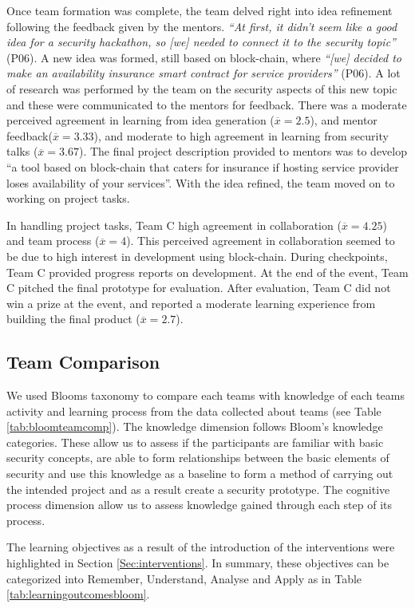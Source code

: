 \documentclass[runningheads]{llncs}
\begin{document}
Once team formation was complete, the team delved right into idea refinement following the feedback given by the mentors. \textit{``At first, it didn't seem like a good idea for a security hackathon, so [we] needed to connect it to the security topic''} (P06). A new idea was formed, still based on block-chain, where \textit{``[we] decided to make an availability insurance smart contract for service providers''} (P06). A lot of research was performed by the team on the security aspects of this new topic and these were communicated to the mentors for feedback. There was a moderate perceived agreement in learning from idea generation ($\overline{x} = 2.5$), and mentor feedback($\overline{x} = 3.33$), and moderate to high agreement in learning from security talks ($\overline{x} = 3.67$). The final project description provided to mentors was to develop ``a tool based on block-chain that caters for insurance if hosting service provider loses availability of your services''. With the idea refined, the team moved on to working on project tasks.

In handling project tasks, Team C high agreement in collaboration ($\overline{x} = 4.25$) and team process ($\overline{x} = 4$). This perceived agreement in collaboration seemed to be due to high interest in development using block-chain. During checkpoints, Team C provided progress reports on development. At the end of the event, Team C pitched the final prototype for evaluation. After evaluation, Team C did not win a prize at the event, and reported a moderate learning experience from building the final product ($\overline{x} = 2.7$).


\subsection{Team Comparison} \label{teamcomparison}
We used Blooms taxonomy to compare each teams with knowledge of each teams activity and learning process from the data collected about teams (see Table \ref{tab:bloomteamcomp}). The knowledge dimension follows Bloom's knowledge categories. These allow us to assess if the participants are familiar with basic security concepts, are able to form relationships between the basic elements of security and use this knowledge as a baseline to form a method of carrying out the intended project and as a result create a security prototype. The cognitive process dimension allow us to assess knowledge gained through each step of its process.

The learning objectives as a result of the introduction of the interventions were highlighted in Section \ref{Sec:interventions}. In summary, these objectives can be categorized into Remember, Understand, Analyse and Apply as in Table \ref{tab:learningoutcomesbloom}.
\end{document}
